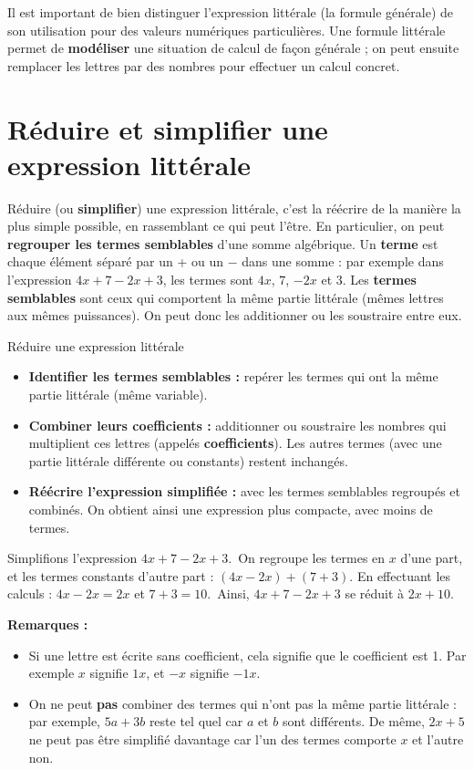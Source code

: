Il est important de bien distinguer l'expression littérale (la formule générale) de son utilisation pour des valeurs numériques particulières. Une formule littérale permet de \textbf{modéliser} une situation de calcul de façon générale ; on peut ensuite remplacer les lettres par des nombres pour effectuer un calcul concret.

\section{Réduire et simplifier une expression littérale}
Réduire (ou \textbf{simplifier}) une expression littérale, c'est la réécrire de la manière la plus simple possible, en rassemblant ce qui peut l'être. En particulier, on peut \textbf{regrouper les termes semblables} d'une somme algébrique. Un \textbf{terme} est chaque élément séparé par un + ou un $-$ dans une somme : par exemple dans l'expression $4x + 7 - 2x + 3$, les termes sont $4x$, $7$, $-2x$ et $3$. Les \textbf{termes semblables} sont ceux qui comportent la même partie littérale (mêmes lettres aux mêmes puissances). On peut donc les additionner ou les soustraire entre eux.

\begin{methode}{Réduire une expression littérale}
\begin{itemize} 
\item \textbf{Identifier les termes semblables :} repérer les termes qui ont la même partie littérale (même variable).
\item \textbf{Combiner leurs coefficients :} additionner ou soustraire les nombres qui multiplient ces lettres (appelés \textbf{coefficients}). Les autres termes (avec une partie littérale différente ou constants) restent inchangés. 
\item \textbf{Réécrire l'expression simplifiée :} avec les termes semblables regroupés et combinés. On obtient ainsi une expression plus compacte, avec moins de termes. 
\end{itemize} 
\end{methode}

\begin{exemple} Simplifions l'expression $4x + 7 - 2x + 3$.\ On regroupe les termes en $x$ d'une part, et les termes constants d'autre part : $(4x - 2x) + (7 + 3)$. En effectuant les calculs : $4x - 2x = 2x$ et $7 + 3 = 10$.\ Ainsi, $4x + 7 - 2x + 3$ se réduit à $\boxed{2x + 10}$. 
\end{exemple}

\textbf{Remarques :} 
\begin{itemize}[label=\textbullet] 
\item Si une lettre est écrite sans coefficient, cela signifie que le coefficient est 1. Par exemple $x$ signifie $1x$, et $-x$ signifie $-1x$. 
\item On ne peut \textbf{pas} combiner des termes qui n'ont pas la même partie littérale : par exemple, $5a + 3b$ reste tel quel car $a$ et $b$ sont différents. De même, $2x + 5$ ne peut pas être simplifié davantage car l'un des termes comporte $x$ et l'autre non. 
\end{itemize}


